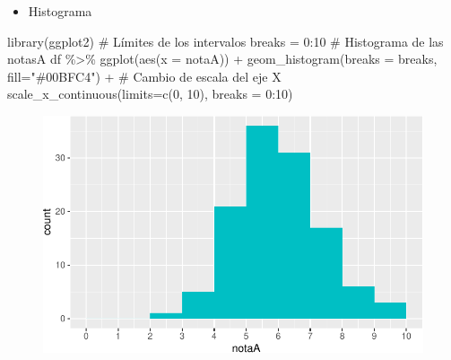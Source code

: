\documentclass[
  a4paper,
]{scrreport}
\newenvironment{Shaded}{\begin{snugshade}}{\end{snugshade}}
\newcommand{\AttributeTok}[1]{\textcolor[rgb]{0.40,0.45,0.13}{#1}}
\newcommand{\CommentTok}[1]{\textcolor[rgb]{0.37,0.37,0.37}{#1}}
\newcommand{\DecValTok}[1]{\textcolor[rgb]{0.68,0.00,0.00}{#1}}
\newcommand{\FunctionTok}[1]{\textcolor[rgb]{0.28,0.35,0.67}{#1}}
\newcommand{\NormalTok}[1]{\textcolor[rgb]{0.00,0.23,0.31}{#1}}
\newcommand{\OtherTok}[1]{\textcolor[rgb]{0.00,0.23,0.31}{#1}}
\newcommand{\SpecialCharTok}[1]{\textcolor[rgb]{0.37,0.37,0.37}{#1}}
\newcommand{\StringTok}[1]{\textcolor[rgb]{0.13,0.47,0.30}{#1}}
\providecommand{\tightlist}{%
  \setlength{\itemsep}{0pt}\setlength{\parskip}{0pt}}\usepackage{longtable,booktabs,array}
\theoremstyle{definition}
\theoremstyle{definition}
\theoremstyle{remark}
\begin{document}
\begin{itemize}
\tightlist
\item
  Histograma
\end{itemize}

\begin{Shaded}
\begin{Highlighting}[]
\FunctionTok{library}\NormalTok{(ggplot2)}
\CommentTok{\# Límites de los intervalos}
\NormalTok{breaks }\OtherTok{=} \DecValTok{0}\SpecialCharTok{:}\DecValTok{10}
\CommentTok{\# Histograma de las notasA}
\NormalTok{df }\SpecialCharTok{\%\textgreater{}\%} \FunctionTok{ggplot}\NormalTok{(}\FunctionTok{aes}\NormalTok{(}\AttributeTok{x =}\NormalTok{ notaA)) }\SpecialCharTok{+} 
  \FunctionTok{geom\_histogram}\NormalTok{(}\AttributeTok{breaks =}\NormalTok{ breaks, }\AttributeTok{fill=}\StringTok{"\#00BFC4"}\NormalTok{) }\SpecialCharTok{+} 
  \CommentTok{\# Cambio de escala del eje X}
  \FunctionTok{scale\_x\_continuous}\NormalTok{(}\AttributeTok{limits=}\FunctionTok{c}\NormalTok{(}\DecValTok{0}\NormalTok{, }\DecValTok{10}\NormalTok{), }\AttributeTok{breaks =} \DecValTok{0}\SpecialCharTok{:}\DecValTok{10}\NormalTok{) }
\end{Highlighting}
\end{Shaded}

\begin{figure}[H]

{\centering \includegraphics{08-analisis-estadisticos_files/figure-pdf/unnamed-chunk-11-1.pdf}

}

\end{figure}
\end{document}
